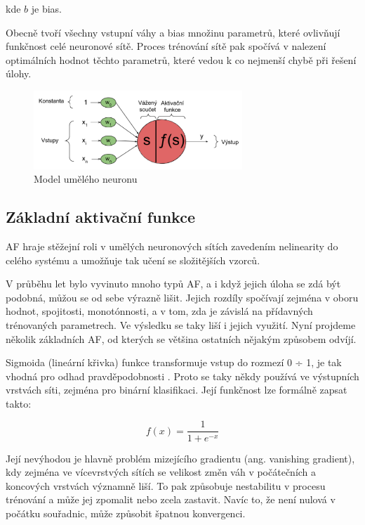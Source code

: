 kde $b$ je bias.

Obecně tvoří všechny vstupní váhy a bias množinu parametrů, které ovlivňují
funkčnost celé neuronové sítě. Proces trénování sítě pak spočívá v nalezení
optimálních hodnot těchto parametrů, které vedou k co nejmenší chybě při řešení
úlohy.

\begin{figure}[]
    \centering
    \includegraphics[width=0.7\textwidth]{Figures/neuron.png}
    \caption{Model umělého neuronu \cite{lagan}}
    \label{fig:neuron}
\end{figure}

\subsection{Základní aktivační funkce}

AF hraje stěžejní roli v umělých neuronových sítích zavedením nelinearity do
celého systému a umožňuje tak učení se složitějších vzorců.

V průběhu let bylo vyvinuto mnoho typů AF, a i když jejich úloha se zdá být
podobná, můžou se od sebe výrazně lišit. Jejich rozdíly spočívají zejména v
oboru hodnot, spojitosti, monotónnosti, a v tom, zda je závislá na přídavných
trénovaných parametrech. Ve výsledku se taky liší i jejich využití. Nyní
projdeme několik základních AF, od kterých se většina ostatních nějakým
způsobem odvíjí.

Sigmoida (lineární křivka) funkce transformuje vstup do rozmezí 0 ÷ 1, je tak
vhodná pro odhad pravděpodobnosti \cite{sigmoidImplementation}. Proto se taky někdy používá ve výstupních
vrstvách síti, zejména pro binární klasifikaci. Její funkčnost lze formálně
zapsat takto:

\begin{equation*}
    f(x)= \frac{1}{1+e^{-x}}
\end{equation*}

Její nevýhodou je hlavně problém mizejícího gradientu (ang. vanishing
gradient), kdy zejména ve vícevrstvých sítích se velikost změn váh v
počátečních a koncových vrstvách významně liší. To pak způsobuje nestabilitu v
procesu trénování a může jej zpomalit nebo zcela zastavit. Navíc to, že není
nulová v počátku souřadnic, může způsobit špatnou konvergenci.

